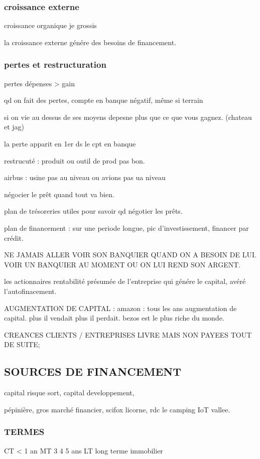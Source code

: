 \documentclass[a4paper,12pt]{article}
\begin{document}
\subsubsection{croissance externe}
croissance organique je grossis

la croissance externe génére des besoins de financement.


\subsubsection{pertes et restructuration}
pertes dépenses > gain

qd on fait des pertes, compte en banque négatif, même si terrain

si on vie au dessus de ses moyens depesne plus que ce que vous gagnez. (chateau et jag)

la perte apparit en 1er ds le cpt en banque

restrucuté : produit ou outil de prod pas bon.

airbus : usine pas au niveau ou avions pas ua niveau

négocier le prêt quand tout va bien.

plan de trésoreries utiles pour savoir qd négotier les prêts.

plan de financement : sur une periode longue, pic d'investissement, financer par crédit.

NE JAMAIS ALLER VOIR SON BANQUIER QUAND ON A BESOIN DE LUI.
VOIR UN BANQUIER AU MOMENT OU ON LUI REND SON ARGENT.


les actionnaires rentabilité présumée de l'entreprise qui génére le capital, avéré  l'autofinacement. 



AUGMENTATION DE CAPITAL :
amazon : tous les ans augmentation de capital.
plus il vendait plus il perdait. bezos est le plus riche du monde.


CREANCES CLIENTS / ENTREPRISES LIVRE MAIS NON PAYEES TOUT DE SUITE;

\subsection{SOURCES DE FINANCEMENT}

capital risque sort, capital developpement,

pépinière, gros marché financier, scifox licorne, rdc le camping IoT vallee.

\subsubsection{TERMES}
 CT < 1 an
 MT 3 4 5 ans
 LT long terme immobilier
\end{document}
